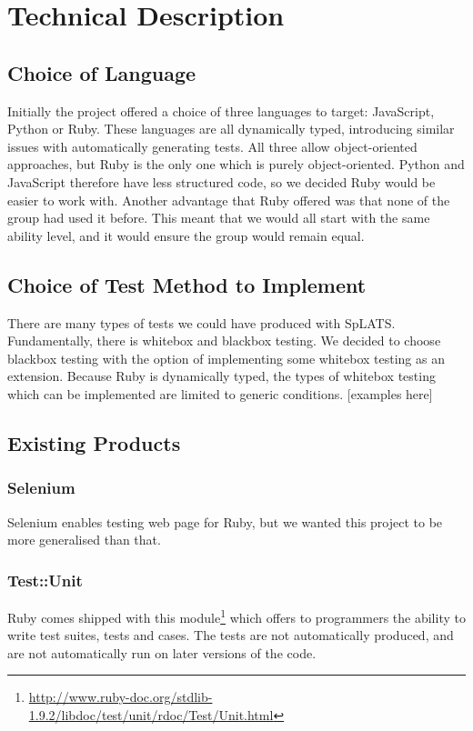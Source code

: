 \chapter{Technical Description}

\section{Choice of Language}%
  Initially the project offered a choice of three languages to target: JavaScript, Python or Ruby.
  These languages are all dynamically typed, introducing similar issues with automatically generating tests.
  All three allow object-oriented approaches, but Ruby is the only one which is purely object-oriented.
  Python and JavaScript therefore have less structured code, so we decided Ruby would be easier to work with.
  Another advantage that Ruby offered was that none of the group had used it before.
  This meant that we would all start with the same ability level, and it would ensure the group would remain equal.%

\section{Choice of Test Method to Implement}%
  There are many types of tests we could have produced with SpLATS.
  Fundamentally, there is whitebox and blackbox testing.
  We decided to choose blackbox testing with the option of implementing some whitebox testing as an extension.
  Because Ruby is dynamically typed, the types of whitebox testing which can be implemented are limited to generic conditions.
  [examples here]%

\section{Existing Products}
  \subsection{Selenium}
    Selenium enables testing web page for Ruby, but we wanted this project to be more generalised than that.

  \subsection{Test::Unit}
    Ruby comes shipped with this module\footnote{\url{http://www.ruby-doc.org/stdlib-1.9.2/libdoc/test/unit/rdoc/Test/Unit.html}} which offers to programmers the ability to write test suites, tests and cases.
    The tests are not automatically produced, and are not automatically run on later versions of the code.

